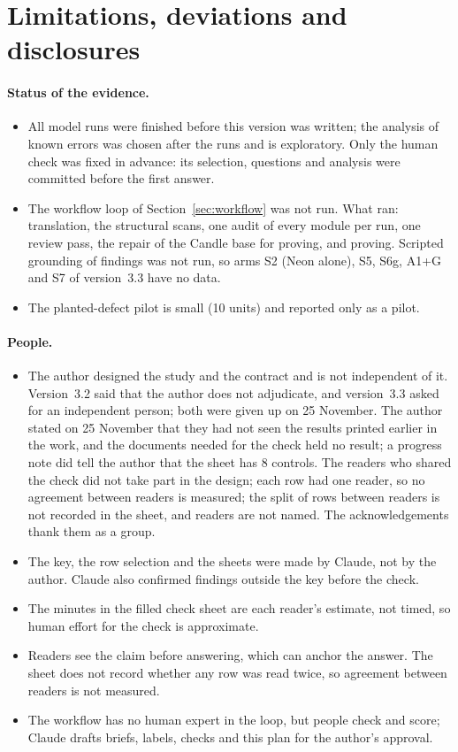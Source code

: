\documentclass[11pt,a4paper]{article}
\begin{document}
\section{Limitations, deviations and disclosures}\label{sec:limits}
\paragraph{Status of the evidence.}
\begin{itemize}
\item All model runs were finished before this version was written; the analysis of known errors was chosen after the runs and is exploratory. Only the human check was fixed in advance: its selection, questions and analysis were committed before the first answer.
\item The workflow loop of Section~\ref{sec:workflow} was not run. What ran: translation, the structural scans, one audit of every module per run, one review pass, the repair of the Candle base for proving, and proving. Scripted grounding of findings was not run, so arms S2 (Neon alone), S5, S6g, A1+G and S7 of version~3.3 have no data.
\item The planted-defect pilot is small (10 units) and reported only as a pilot.
\end{itemize}
\paragraph{People.}
\begin{itemize}
\item The author designed the study and the contract and is not independent of it. Version~3.2 said that the author does not adjudicate, and version~3.3 asked for an independent person; both were given up on 25 November. The author stated on 25 November that they had not seen the results printed earlier in the work, and the documents needed for the check held no result; a progress note did tell the author that the sheet has 8 controls. The readers who shared the check did not take part in the design; each row had one reader, so no agreement between readers is measured; the split of rows between readers is not recorded in the sheet, and readers are not named. The acknowledgements thank them as a group.
\item The key, the row selection and the sheets were made by Claude, not by the author. Claude also confirmed findings outside the key before the check.
\item The minutes in the filled check sheet are each reader's estimate, not timed, so human effort for the check is approximate.
\item Readers see the claim before answering, which can anchor the answer. The sheet does not record whether any row was read twice, so agreement between readers is not measured.
\item The workflow has no human expert in the loop, but people check and score; Claude drafts briefs, labels, checks and this plan for the author's approval.
\end{itemize}
\end{document}
